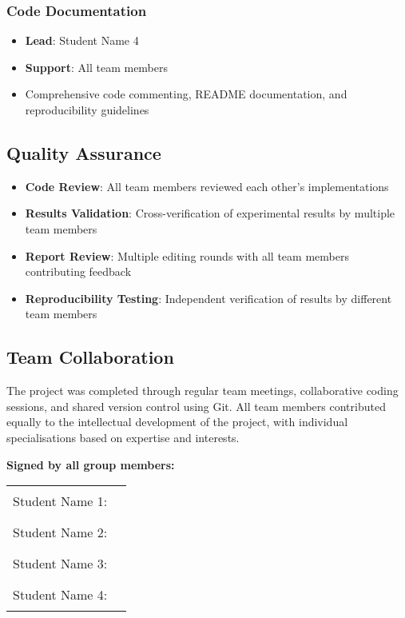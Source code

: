\documentclass[11pt,a4paper]{article}
\begin{document}
\subsubsection{Code Documentation}
\begin{itemize}
    \item \textbf{Lead}: Student Name 4
    \item \textbf{Support}: All team members
    \item Comprehensive code commenting, README documentation, and repro\-duci\-bility guidelines
\end{itemize}

\subsection{Quality Assurance}

\begin{itemize}
    \item \textbf{Code Review}: All team members reviewed each other's implementations
    \item \textbf{Results Validation}: Cross-verification of experimental results by multiple team members
    \item \textbf{Report Review}: Multiple editing rounds with all team members contributing feedback
    \item \textbf{Reproducibility Testing}: Independent verification of results by different team members
\end{itemize}

\subsection{Team Collaboration}

The project was completed through regular team meetings, collaborative coding sessions, and shared version control using Git. All team members contributed equally to the intellectual development of the project, with individual specialisations based on expertise and interests.

\textbf{Signed by all group members:}

\vspace{1cm}

\begin{tabular}{ll}
    Student Name 1: & \rule{6cm}{0.4pt} \\[1cm]
    Student Name 2: & \rule{6cm}{0.4pt} \\[1cm]
    Student Name 3: & \rule{6cm}{0.4pt} \\[1cm]
    Student Name 4: & \rule{6cm}{0.4pt} \\
\end{tabular}
\end{document}
